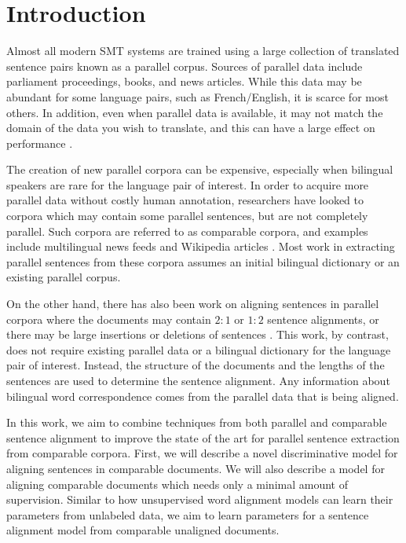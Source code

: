 \chapter{Introduction}
\label{chap:intro}

Almost all modern SMT systems are trained using a large collection of translated
sentence pairs known as a parallel corpus. Sources of parallel data include
parliament proceedings, books, and news articles.
While this data may be abundant for some language pairs, such as
French/English, it is scarce for most others. In addition, even when parallel
data is available, it may not match the domain of the data you wish to
translate, and this can have a large effect on performance \citep{Munteanu05}.

The creation of new parallel corpora can be expensive, especially when bilingual
speakers are rare for the language pair of interest.
In order to acquire more parallel data without costly human annotation,
researchers have looked to corpora which may contain some parallel sentences,
but are not completely parallel. Such corpora are referred to as comparable
corpora, and examples include multilingual news feeds \citep{Munteanu05} and
Wikipedia articles \citep{Adafre06,Smith10}. 
Most work in extracting parallel sentences from
these corpora assumes an initial bilingual dictionary or an existing parallel
corpus.

On the other hand, there has also been work on aligning sentences in parallel
corpora where the documents may contain $2:1$ or $1:2$ sentence alignments, or
there may be large insertions or deletions of sentences \citep{Gale93,Chen93,Moore02}.
This work, by contrast, does not require existing parallel data or a
bilingual dictionary for the language pair of interest. Instead, the structure
of the documents and the lengths of the sentences are used to determine the
sentence alignment. Any information about bilingual word correspondence comes
from the parallel data that is being aligned.

In this work, we aim to combine techniques from both parallel and comparable
sentence alignment to improve the state of the art for parallel sentence
extraction from comparable corpora. First, we will describe a novel
discriminative model for aligning sentences in comparable documents.
We will also describe a model for aligning comparable documents which
needs only a minimal amount of supervision. Similar to how unsupervised word
alignment models can learn their parameters from unlabeled data, we aim to learn
parameters for a sentence alignment model from comparable unaligned documents.


